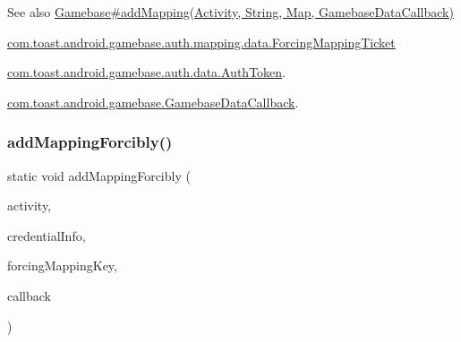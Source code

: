 \begin{DoxySeeAlso}{See also}
\hyperlink{}{Gamebase\#add\+Mapping(\+Activity, String, Map, Gamebase\+Data\+Callback)} 

\hyperlink{classcom_1_1toast_1_1android_1_1gamebase_1_1auth_1_1mapping_1_1data_1_1_forcing_mapping_ticket}{com.\+toast.\+android.\+gamebase.\+auth.\+mapping.\+data.\+Forcing\+Mapping\+Ticket} 

\hyperlink{classcom_1_1toast_1_1android_1_1gamebase_1_1auth_1_1data_1_1_auth_token}{com.\+toast.\+android.\+gamebase.\+auth.\+data.\+Auth\+Token}. 

\hyperlink{interfacecom_1_1toast_1_1android_1_1gamebase_1_1_gamebase_data_callback}{com.\+toast.\+android.\+gamebase.\+Gamebase\+Data\+Callback}. 
\end{DoxySeeAlso}
\mbox{\label{classcom_1_1toast_1_1android_1_1gamebase_1_1_gamebase_aad7e2e23e0143342ba53d5c9158d4c7b}} 
\subsubsection{\texorpdfstring{add\+Mapping\+Forcibly()}{addMappingForcibly()}\hspace{0.1cm}{\footnotesize\ttfamily [3/3]}}
{\footnotesize\ttfamily static void add\+Mapping\+Forcibly (\begin{DoxyParamCaption}\item[{@Non\+Null final Activity}]{activity,  }\item[{@Non\+Null final Map$<$ String, Object $>$}]{credential\+Info,  }\item[{@Non\+Null final String}]{forcing\+Mapping\+Key,  }\item[{@Nullable final \hyperlink{interfacecom_1_1toast_1_1android_1_1gamebase_1_1_gamebase_data_callback}{Gamebase\+Data\+Callback}$<$ \hyperlink{classcom_1_1toast_1_1android_1_1gamebase_1_1auth_1_1data_1_1_auth_token}{Auth\+Token} $>$}]{callback }\end{DoxyParamCaption})\hspace{0.3cm}{\ttfamily [static]}}



